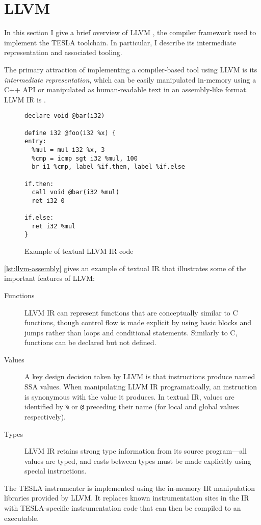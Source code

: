 \section{LLVM}

In this section I give a brief overview of LLVM \cite{lattner_llvm:_2002}, the
compiler framework used to implement the TESLA toolchain. In particular, I
describe its intermediate representation and associated tooling.

The primary attraction of implementing a compiler-based tool using LLVM is its
\emph{intermediate representation}, which can be easily manipulated in-memory
using a C++ API or manipulated as human-readable text in an assembly-like
format. LLVM IR is .

\begin{figure}
  \begin{verbatim}
declare void @bar(i32)

define i32 @foo(i32 %x) {
entry:
  %mul = mul i32 %x, 3
  %cmp = icmp sgt i32 %mul, 100
  br i1 %cmp, label %if.then, label %if.else

if.then:
  call void @bar(i32 %mul)
  ret i32 0

if.else:
  ret i32 %mul
}
  \end{verbatim}
  \caption{Example of textual LLVM IR code}
  \label{lst:llvm-assembly}
\end{figure}

\autoref{lst:llvm-assembly} gives an example of textual IR that illustrates some
of the important features of LLVM:
\begin{description}
  \item[Functions] LLVM IR can represent functions that are conceptually similar
    to C functions, though control flow is made explicit by using basic blocks
    and jumps rather than loops and conditional statements. Similarly to C,
    functions can be declared but not defined.

  \item[Values] A key design decision taken by LLVM is that instructions produce
    named SSA values. When manipulating LLVM IR programatically, an instruction
    is synonymous with the value it produces. In textual IR, values are
    identified by \texttt{\%} or \texttt{@} preceding their name (for local and
    global values respectively).

  \item[Types] LLVM IR retains strong type information from its source
    program---all values are typed, and casts between types must be made
    explicitly using special instructions.
\end{description}

The TESLA instrumenter is implemented using the in-memory IR manipulation
libraries provided by LLVM. It replaces known instrumentation sites in the IR
with TESLA-specific instrumentation code that can then be compiled to an
executable.
